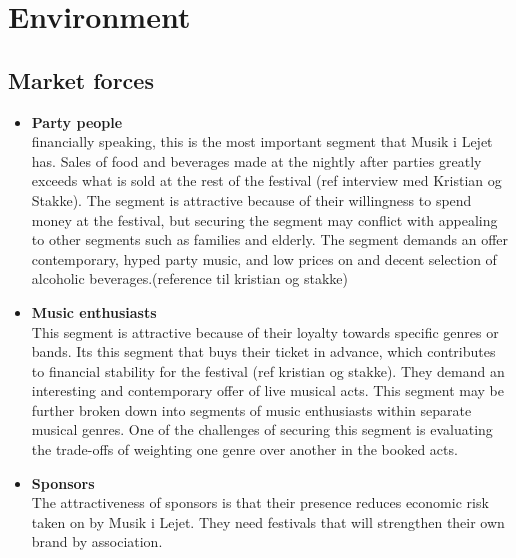 \section{Environment} %
\subsection{Market forces}

\begin{itemize}
	\item \textbf{Party people}\\
	financially speaking, this is the most important segment that Musik i Lejet has. Sales of food and beverages made at the nightly after parties greatly exceeds what is sold at the rest of the festival (ref interview med Kristian og Stakke). The segment is attractive because of their willingness to spend money at the festival, but securing the segment may conflict with appealing to other segments such as families and elderly. The segment demands an offer contemporary, hyped party music, and low prices on and decent selection of alcoholic beverages.(reference til kristian og stakke)
	\item \textbf{Music enthusiasts}\\
	This segment is attractive because of their loyalty towards specific genres or bands. Its this segment that buys their ticket in advance, which contributes to financial stability for the festival (ref kristian og stakke). They demand an interesting and contemporary offer of live musical acts. This segment may be further broken down into segments of music enthusiasts within separate musical genres. One of the challenges of securing this segment is evaluating the trade-offs of weighting one genre over another in the booked acts.
	\item \textbf{Sponsors}\\
	The attractiveness of sponsors is that their presence reduces economic risk taken on by Musik i Lejet. They need festivals that will strengthen their own brand by association.
\end{itemize}


